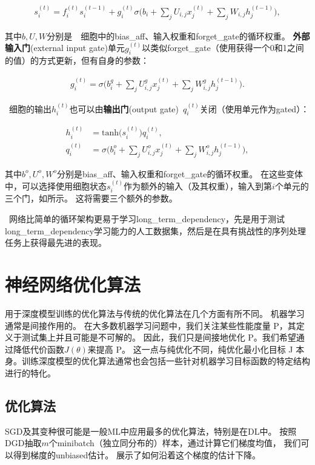 \begin{align}
s_i^{(t)} = f_i^{(t)}  s_i^{(t-1)} +  g_i^{(t)}
\sigma \Big( b_i + \sum_j U_{i,j} x_j^{(t)} + \sum_j W_{i,j} h_j^{(t-1)} \Big),
\end{align}

其中$b, U, W$分别是~~细胞中的\gls{bias_aff}、输入权重和\gls{forget_gate}的循环权重。
\textbf{外部输入门}(external input gate)单元$g_i^{(t)}$以类似\gls{forget_gate}（使用获得一个0和1之间的值）的方式更新，但有自身的参数：

\begin{align}
g_i^{(t)} = \sigma \Big( b_i^g + \sum_j U_{i,j}^g x_j^{(t)} + \sum_j W_{i,j}^g h_j^{(t-1)} \Big).
\end{align}

~细胞的输出$h_i^{(t)}$也可以由\textbf{输出门}(output gate)~$q_i^{(t)}$关闭（使用单元作为\gls{gated}）：

\begin{align}
h_i^{(t)} &= \text{tanh}\big( s_i^{(t)} \big) q_i^{(t)}, \\
q_i^{(t)} &= \sigma \Big( b_i^o + \sum_j U_{i,j}^o x_j^{(t)} + \sum_j W_{i,j}^o h_j^{(t-1)} \Big),
\end{align}

其中$b^o, U^o, W^o$分别是\gls{bias_aff}、输入权重和\gls{forget_gate}的循环权重。
在这些变体中，可以选择使用细胞状态$s_i^{(t)}$作为额外的输入（及其权重），输入到第$i$个单元的三个门，如所示。
这将需要三个额外的参数。

~网络比简单的循环架构更易于学习\gls{long_term_dependency}，先是用于测试\gls{long_term_dependency}学习能力的人工数据集\citep{Bengio-trnn94,Hochreiter+Schmidhuber-1997,chapter-gradient-flow-2001}，然后是在具有挑战性的序列处理任务上获得最先进的表现\citep{Graves-book2012,Graves-arxiv2013,Sutskever-et-al-NIPS2014}。

\section{神经网络优化算法}
用于深度模型训练的优化算法与传统的优化算法在几个方面有所不同。 机器学习通常是间接作用的。
在大多数机器学习问题中，我们关注某些性能度量 P，其定义于测试集上并且可能是不可解的。
因此，我们只是间接地优化 P。我们希望通过降低代价函数$J(θ)$来提高 P。
这一点与纯优化不同，纯优化最小化目标 J 本身。训练深度模型的优化算法通常也会包括一些针对机器学习目标函数的特定结构进行的特化。

\subsection{优化算法}
\label{sec:stochastic_gradient_descent_chap8}
\gls{SGD}及其变种很可能是一般\gls{ML}中应用最多的优化算法，特别是在\gls{DL}中。
按照\gls{DGD}抽取$m$个\gls{minibatch}（独立同分布的）样本，通过计算它们梯度均值，
我们可以得到梯度的\gls{unbiased}估计。
展示了如何沿着这个梯度的估计下降。

